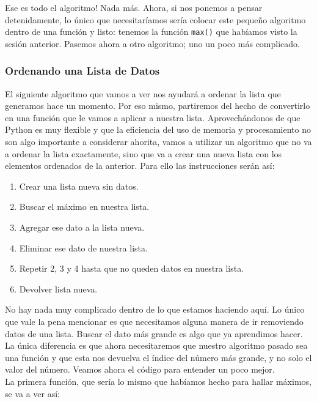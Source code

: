 \documentclass[10pt,letterpaper]{article}
\newcommand{\inlinecode}[1]{
\colorbox{light-gray}{\texttt{#1}}
}
\begin{document}
Ese es todo el algoritmo! Nada m\'as. Ahora, si nos ponemos a pensar detenidamente, lo \'unico que necesitar\'iamos ser\'ia colocar este peque\~no algoritmo dentro de una funci\'on y listo: tenemos la funci\'on \inlinecode{max()} que hab\'iamos visto la sesi\'on anterior. Pasemos ahora a otro algoritmo; uno un poco m\'as complicado.

\subsubsection{Ordenando una Lista de Datos}
El siguiente algoritmo que vamos a ver nos ayudar\'a a ordenar la lista que generamos hace un momento. Por eso mismo, partiremos del hecho de convertirlo en una funci\'on que le vamos a aplicar a nuestra lista. Aprovech\'andonos de que Python es muy flexible y que la eficiencia del uso de memoria y procesamiento no son algo importante a considerar ahorita, vamos a utilizar un algoritmo que no va a ordenar la lista exactamente, sino que va a crear una nueva lista con los elementos ordenados de la anterior. Para ello las instrucciones ser\'an as\'i:

\begin{enumerate}
\item Crear una lista nueva sin datos.
\item Buscar el m\'aximo en nuestra lista.
\item Agregar ese dato a la lista nueva.
\item Eliminar ese dato de nuestra lista.
\item Repetir 2, 3 y 4 hasta que no queden datos en nuestra lista.
\item Devolver lista nueva.
\end{enumerate}

No hay nada muy complicado dentro de lo que estamos haciendo aqu\'i. Lo \'unico que vale la pena mencionar es que necesitamos alguna manera de ir removiendo datos de una lista. Buscar el dato m\'as grande es algo que ya aprendimos hacer. La \'unica diferencia es que ahora necesitaremos que nuestro algoritmo pasado sea una funci\'on y que esta nos devuelva el \'indice del n\'umero m\'as grande, y no solo el valor del n\'umero. Veamos ahora el c\'odigo para entender un poco mejor.\\

\noindent La primera funci\'on, que ser\'ia lo mismo que hab\'iamos hecho para hallar m\'aximos, se va a ver as\'i:
\end{document}
